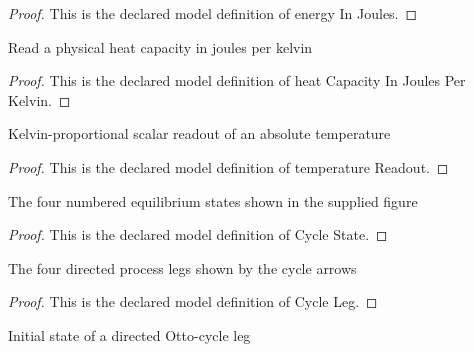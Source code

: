 \begin{proof}
  This is the declared model definition of energy In Joules.
\end{proof}
\begin{definition}
  \label{def:physics:phyx-mini-0437:phyxminiproblems-problemphyxmini0437-heatcapacityinjoulesperkelvin}
  Read a physical heat capacity in joules per kelvin
\end{definition}
\begin{proof}
  This is the declared model definition of heat Capacity In Joules Per Kelvin.
\end{proof}
\begin{definition}
  \label{def:physics:phyx-mini-0437:phyxminiproblems-problemphyxmini0437-temperaturereadout}
  Kelvin-proportional scalar readout of an absolute temperature
\end{definition}
\begin{proof}
  This is the declared model definition of temperature Readout.
\end{proof}
\begin{definition}
  \label{def:physics:phyx-mini-0437:phyxminiproblems-problemphyxmini0437-cyclestate}
  The four numbered equilibrium states shown in the supplied figure
\end{definition}
\begin{proof}
  This is the declared model definition of Cycle State.
\end{proof}
\begin{definition}
  \label{def:physics:phyx-mini-0437:phyxminiproblems-problemphyxmini0437-cycleleg}
  The four directed process legs shown by the cycle arrows
\end{definition}
\begin{proof}
  This is the declared model definition of Cycle Leg.
\end{proof}
\begin{definition}
  \label{def:physics:phyx-mini-0437:phyxminiproblems-problemphyxmini0437-cycleleg-initialstate}
  Initial state of a directed Otto-cycle leg
\end{definition}
